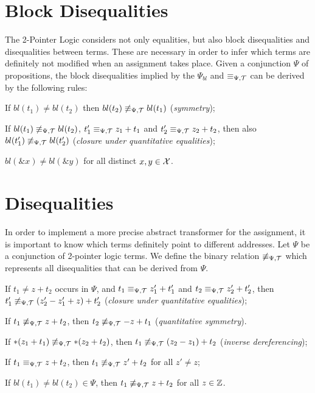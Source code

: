 \section{Block Disequalities}

The 2-Pointer Logic considers not only equalities, but also block disequalities and disequalities between terms.
These are necessary in order to infer which terms are definitely not
modified when an assignment takes place.
Given a conjunction $\Psi$ of propositions, the block disequalities implied by the $\Psi_{bl}$
and $\equiv_{\Psi,\mathcal{T}}$ can be derived by the following rules:

\begin{enumerate}[label={[B\arabic*]}, ref={[B\arabic*]}]
    \setcounter{enumi}{-1} %
    \item	If $bl(t_1)\neq bl(t_2)$ then $bl(t_2)\not\equiv_{\Psi,\mathcal{T}} bl(t_1)$ (\emph{symmetry});
          \item\label{item:closure-under-quantitative-equalities}
          If $bl(t_1)\not\equiv_{\Psi,\mathcal{T}} bl(t_2)$, $t'_1 \equiv_{\Psi,\mathcal{T}} z_1+t_1$ and $t'_2\equiv_{\Psi,\mathcal{T}} z_2+t_2$, then
          also $bl(t'_1)\not\equiv_{\Psi,\mathcal{T}} bl(t'_2)$ (\emph{closure under quantitative equalities});
          \item\label{item:distinct-vars-block-neq} $bl(\&x) \neq bl(\&y)$ for all distinct $x, y \in \mathcal{X}$.
\end{enumerate}



\section{Disequalities}\label{disequalities}

In order to implement a more precise abstract transformer for the assignment, it is important to know which terms definitely
point to different addresses. Let $\Psi$ be a conjunction of 2-pointer logic terms.
We define the binary relation $\not\equiv_{\Psi,\mathcal{T}}$ which represents all disequalities that can be derived from $\Psi$.

\begin{enumerate}[label={[D\arabic*]}, ref={[D\arabic*]}]
    \setcounter{enumi}{-1} %
    \item\label{item:neq-quantitative-equalities}
    If $t_1 \neq z + t_2$ occurs in $\Psi$, and $t_1 \equiv_{\Psi,\mathcal{T}} z'_1 + t'_1$ and $t_2\equiv_{\Psi,\mathcal{T}} z'_2+t'_2$,
    then $t'_1\not\equiv_{\Psi,\mathcal{T}} (z'_2-z'_1+z)+t'_2$ (\emph{closure under quantitative equalities});
    \item If $t_1 \not\equiv_{\Psi,\mathcal{T}} z + t_2$, then $t_2 \not\equiv_{\Psi,\mathcal{T}} -z + t_1$ (\emph{quantitative symmetry}).
          \item\label{item:inverse-deref}
          If $*(z_1 + t_1) \not\equiv_{\Psi,\mathcal{T}} *(z_2 + t_2)$, then $t_1 \not\equiv_{\Psi,\mathcal{T}} (z_2 - z_1) + t_2$
          (\emph{inverse dereferencing});
          \item\label{item:eq-neq} If $t_1 \equiv_{\Psi,\mathcal{T}} z + t_2$, then $t_1\not\equiv_{\Psi,\mathcal{T}} z'+t_2$ for all $z'\neq z$;
          \item\label{item:block-neq} If $bl(t_1) \neq bl(t_2) \in \Psi$, then $t_1 \not\equiv_{\Psi,\mathcal{T}} z + t_2$ for all $z \in \mathbb{Z}$.
\end{enumerate}


